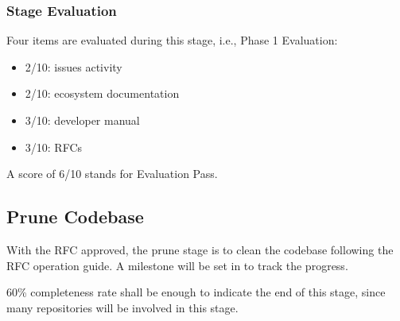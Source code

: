 \subsubsection*{Stage Evaluation}

Four items are evaluated during this stage, i.e., \textsf{Phase 1 Evaluation}:
\begin{itemize}
    \item 2/10: issues activity
    \item 2/10: ecosystem documentation
    \item 3/10: developer manual
    \item 3/10: RFCs
\end{itemize}
A score of 6/10 stands for \textsf{Evaluation Pass}.

\subsection{Prune Codebase}\label{subsec:prune}

With the RFC approved, the prune stage is to clean the codebase following the RFC operation guide. A milestone will be set in \repoimages{} to track the progress.

60\% completeness rate shall be enough to indicate the end of this stage, since many repositories will be involved in this stage.

